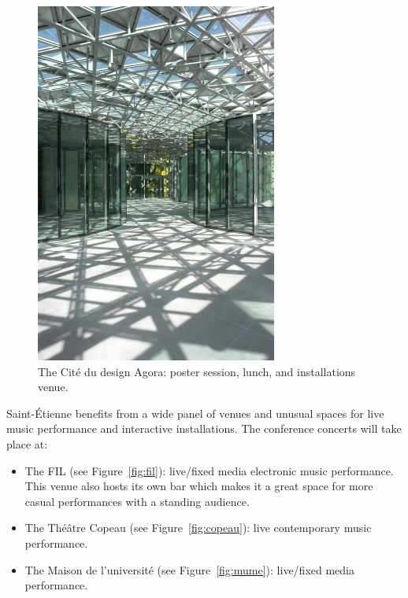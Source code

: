 \documentclass[fontsize=12pt]{scrartcl} %
\numberwithin{equation}{section} %
\numberwithin{figure}{section} %
\numberwithin{table}{section} %
\begin{document}
\begin{figure}[htpb]
\begin{center}
\includegraphics[scale=0.5]{img/agora.jpg}
\caption{The Cité du design Agora: poster session, lunch, and installations venue.}
\label{fig:agora}
\end{center}
\end{figure}

Saint-Étienne benefits from a wide panel of venues and unusual spaces for live music performance and interactive installations. The conference concerts will take place at:
\begin{itemize}
  \item The FIL (see Figure~\ref{fig:fil}): live/fixed media electronic music performance. This venue also hosts its own bar which makes it a great space for more casual performances with a standing audience.
  \item The Théâtre Copeau (see Figure~\ref{fig:copeau}): live contemporary music performance.
  \item The Maison de l'université (see Figure~\ref{fig:mume}): live/fixed media  performance.
\end{itemize}
\end{document}

